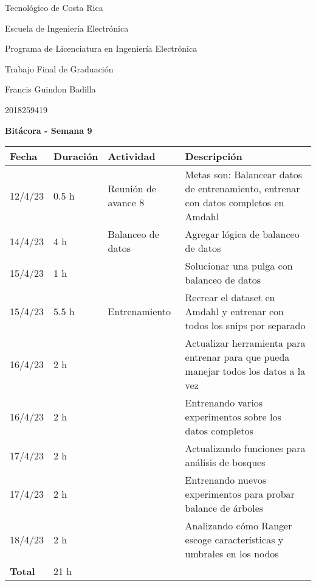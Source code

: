 \documentclass[12pt,oneside]{book}
\begin{document}
 \graphicspath{{./}{../tesis/fig/}}
  Tecnológico de Costa Rica
  \par\vspace{1mm}
  Escuela de Ingeniería Electrónica
  \par\vspace{1mm}
  Programa de Licenciatura en Ingeniería Electrónica
  \par\vspace{10mm}
  Trabajo Final de Graduación
  \par\vspace{1mm}
  Francis Guindon Badilla
  \par\vspace{1mm}
  2018259419
  \par\vspace{10mm}
  \large\textbf{Bitácora - Semana 9}
  \par\vspace{10mm}
  \small

  \begin{table} [!h]
    \centering
    \small
    \begin{tabular}{p{1.5 cm} p{2.1 cm} p{5 cm} p{8 cm}}
      \hline
      Fecha & Duración & Actividad & Descripción \\
      \hline
      12/4/23 & 0.5 h & Reunión de avance 8 & Metas son: Balancear datos de entrenamiento, entrenar con datos completos en Amdahl \\
      14/4/23 & 4 h & Balanceo de datos & Agregar lógica de balanceo de datos \\
      15/4/23 & 1 h & & Solucionar una pulga con balanceo de datos \\
      15/4/23 & 5.5 h & Entrenamiento & Recrear el dataset en Amdahl y entrenar con todos los snips por separado \\
      16/4/23 & 2 h & & Actualizar herramienta para entrenar para que pueda manejar todos los datos a la vez \\
      16/4/23 & 2 h & & Entrenando varios experimentos sobre los datos completos \\
      17/4/23 & 2 h & & Actualizando funciones para análisis de bosques \\
      17/4/23 & 2 h & & Entrenando nuevos experimentos para probar balance de árboles \\
      18/4/23 & 2 h & & Analizando cómo Ranger escoge características y umbrales en los nodos \\
      \hline
      \textbf{Total} & 21 h \\
      \hline
    \end{tabular}
  \end{table}
  
\end{document}
